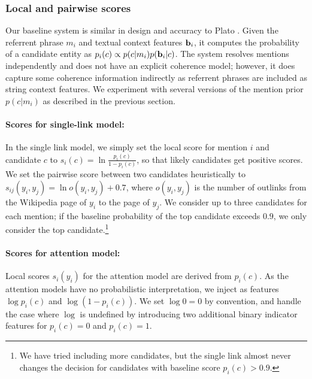 \subsubsection{Local and pairwise scores}
\label{sec:expt:features}

Our baseline system is similar in design and accuracy to Plato \cite{Lazic2015}.
Given the referrent phrase $m_i$ and textual context features ${\bf b}_i$, it computes
the probability of a candidate entity as $p_i(c) \propto p(c|m_i)p({\bf b}_i|c)$. 
The system resolves mentions independently and does not have an explicit coherence model;
however, it does capture some coherence information indirectly as referrent phrases are
included as string context features. We experiment with several versions of the
mention prior $p(c|m_i)$ as described in the previous section.


\paragraph*{Scores for single-link model:}
In the {single link} model, we simply set the local score for
mention $i$ and candidate $c$ to $s_i(c) = \ln \frac{p_i(c )}{1 -
p_i(c)}$, so that likely candidates get positive
scores.  We set the pairwise score between two candidates heuristically to
$s_{ij}(y_i, y_j) = \ln o(y_i, y_j) + 0.7$, where $o(y_i, y_j)$ is the number of
outlinks from the Wikipedia page of $y_i$ to the page of $y_j$.  We
consider up to three candidates for each mention; if the baseline
probability of the top candidate exceeds $0.9$, we only consider the top
candidate.\footnote{We have tried including more candidates, but the single link
almost never changes the decision for candidates with baseline score $p_i(c)>0.9$.}


\def\ind#1{[\![ #1 ]\!]}


\paragraph*{Scores for attention model:}
{Local scores} $s_i(y_i)$ for the attention model are derived
from $p_i(c)$.  As the attention models have no probabilistic
interpretation, we inject as features
$\log p_i(c)$ and $\log(1-p_i(c))$. We set $\log0=0$ by convention,
and handle the case where $\log$ is undefined by introducing two additional
binary indicator features for $p_i(c)=0$ and $p_i(c)=1$.

